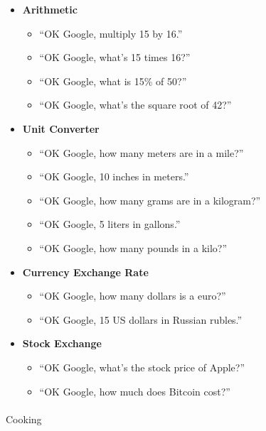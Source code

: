 \documentclass[
  a4paper,
]{article}
\makeatletter
\let\oldparagraph\paragraph
\renewcommand{\paragraph}{
    \@ifstar
      \xxxParagraphStar
      \xxxParagraphNoStar
  }
\newcommand{\xxxParagraphStar}[1]{\oldparagraph*{#1}\mbox{}}
\newcommand{\xxxParagraphNoStar}[1]{\oldparagraph{#1}\mbox{}}
\providecommand{\tightlist}{%
  \setlength{\itemsep}{0pt}\setlength{\parskip}{0pt}}\usepackage{longtable,booktabs,array}
\makeatother
\begin{document}
\begin{itemize}
\tightlist
\item
  \textbf{Arithmetic}

  \begin{itemize}
  \tightlist
  \item
    ``OK Google, multiply 15 by 16.''
  \item
    ``OK Google, what's 15 times 16?''
  \item
    ``OK Google, what is 15\% of 50?''
  \item
    ``OK Google, what's the square root of 42?''
  \end{itemize}
\item
  \textbf{Unit Converter}

  \begin{itemize}
  \tightlist
  \item
    ``OK Google, how many meters are in a mile?''
  \item
    ``OK Google, 10 inches in meters.''
  \item
    ``OK Google, how many grams are in a kilogram?''
  \item
    ``OK Google, 5 liters in gallons.''
  \item
    ``OK Google, how many pounds in a kilo?''
  \end{itemize}
\item
  \textbf{Currency Exchange Rate}

  \begin{itemize}
  \tightlist
  \item
    ``OK Google, how many dollars is a euro?''
  \item
    ``OK Google, 15 US dollars in Russian rubles.''
  \end{itemize}
\item
  \textbf{Stock Exchange}

  \begin{itemize}
  \tightlist
  \item
    ``OK Google, what's the stock price of Apple?''
  \item
    ``OK Google, how much does Bitcoin cost?''
  \end{itemize}
\end{itemize}

\paragraph{Cooking}\label{cooking}
\end{document}
